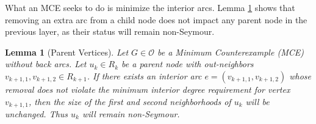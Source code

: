 \documentclass[AMS, Times1COL]{article} %
\newtheorem{lemma}[theorem]{Lemma}
\theoremstyle{definition}
\begin{document}
	
		\label{layerEquiv}
			
			
	
	What an MCE seeks to do is minimize the interior arcs. Lemma \ref{parOk} shows that removing an extra arc from a child node does not impact any parent node in the previous layer, as their status will remain non-Seymour. 
	
	\begin{lemma}[Parent Vertices]
		Let $G \in \mathcal{O}$ be a Minimum Counterexample (MCE) without back arcs. Let $u_k \in R_k$ be a parent node with out-neighbors $v_{k+1,1}, v_{k+1,2} \in R_{k+1}$. 
		If there exists an interior arc $e = (v_{k+1,1}, v_{k+1,2})$ whose removal does not violate the minimum interior degree requirement for vertex $v_{k+1,1}$, then the size of the first and second neighborhoods of $u_k$ will be unchanged. Thus $u_k$ will remain non-Seymour.
		\label{parOk}
	\end{lemma} 
	
\end{document}
